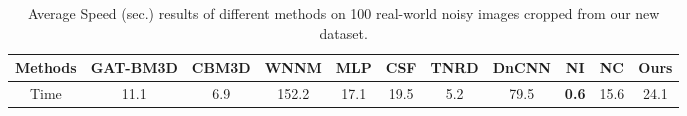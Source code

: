 \begin{table}[t!]
\begin{adjustwidth}{-.2cm}{}
\scriptsize
\caption{Average Speed (sec.) results of different methods on 100 real-world noisy images cropped from our new dataset.}
\label{tab3-8}
\begin{center}
\renewcommand\arraystretch{1}
\begin{tabular}{|c||c|c|c|c|c|c|c|c|c|c|}
\hline
Methods
&\textbf{GAT-BM3D}
&\textbf{CBM3D}
&\textbf{WNNM}
&\textbf{MLP}
&\textbf{CSF} 
&\textbf{TNRD} 
&\textbf{DnCNN}
&\textbf{NI} 
&\textbf{NC} 
&\textbf{Ours} 
\\
\hline
Time  
& 11.1 & 6.9 & 152.2 & 17.1 & 19.5 & 5.2 & 79.5 & \textbf{0.6} & 15.6 & 24.1
\\
\hline
\end{tabular}
\end{center}
\end{adjustwidth}\vspace{-0mm}
\end{table}


